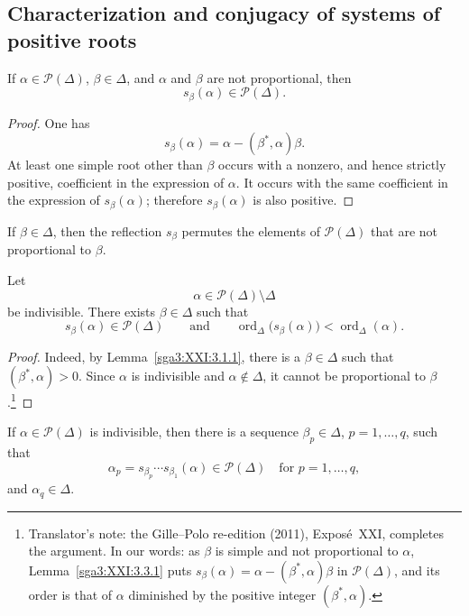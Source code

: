 \subsection{Characterization and conjugacy of systems of positive roots}

\begin{lemma}\label{sga3:XXI:3.3.1}
If \(\alpha\in\mathscr{P}(\Delta)\), \(\beta\in\Delta\), and
\(\alpha\) and \(\beta\) are not proportional, then
\[
 s_\beta(\alpha)\in\mathscr{P}(\Delta).
\]
\end{lemma}

\begin{proof}
One has
\[
 s_\beta(\alpha)=\alpha-(\beta^\ast,\alpha)\beta.
\]
At least one simple root other than \(\beta\) occurs with a nonzero,
and hence strictly positive, coefficient in the expression of
\(\alpha\). It occurs with the same coefficient in the expression of
\(s_\beta(\alpha)\); therefore \(s_\beta(\alpha)\) is also positive.
\end{proof}

\begin{corollary}\label{sga3:XXI:3.3.2}
If \(\beta\in\Delta\), then the reflection \(s_\beta\) permutes the
elements of \(\mathscr{P}(\Delta)\) that are not proportional to
\(\beta\).
\end{corollary}

\begin{lemma}\label{sga3:XXI:3.3.3}
Let
\[
 \alpha\in\mathscr{P}(\Delta)\setminus\Delta
\]
be indivisible. There exists \(\beta\in\Delta\) such that
\[
 s_\beta(\alpha)\in\mathscr{P}(\Delta)
 \qquad\text{and}\qquad
 \operatorname{ord}_\Delta\bigl(s_\beta(\alpha)\bigr)
   <\operatorname{ord}_\Delta(\alpha).
\]
\end{lemma}

\begin{proof}
Indeed, by Lemma~\ref{sga3:XXI:3.1.1}, there is a \(\beta\in\Delta\) such
that \((\beta^\ast,\alpha)>0\). Since \(\alpha\) is indivisible and
\(\alpha\notin\Delta\), it cannot be proportional to \(\beta\).\footnote{Translator's note: the Gille--Polo re-edition (2011), Exposé~XXI,
completes the argument. In our words: as \(\beta\) is simple and not proportional to
\(\alpha\), Lemma~\ref{sga3:XXI:3.3.1} puts
\(s_\beta(\alpha)=\alpha-(\beta^\ast,\alpha)\beta\) in \(\mathscr{P}(\Delta)\), and its
order is that of \(\alpha\) diminished by the positive integer \((\beta^\ast,\alpha)\).}
\end{proof}

\begin{corollary}\label{sga3:XXI:3.3.4}
If \(\alpha\in\mathscr{P}(\Delta)\) is indivisible, then there is a
sequence \(\beta_p\in\Delta\), \(p=1,\ldots,q\), such that
\[
 \alpha_p
 =s_{\beta_p}\cdots s_{\beta_1}(\alpha)
 \in\mathscr{P}(\Delta)
 \quad\text{for }p=1,\ldots,q,
\]
and \(\alpha_q\in\Delta\).
\end{corollary}

